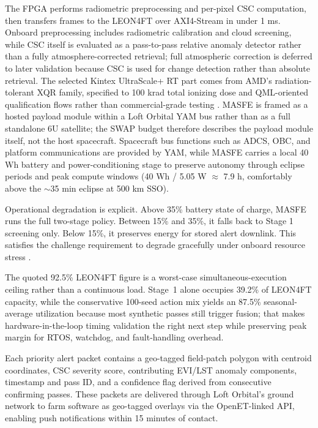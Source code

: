 \documentclass[11pt,letterpaper]{article}
\begin{document}
The FPGA performs radiometric preprocessing and per-pixel CSC computation, then transfers frames to the LEON4FT over AXI4-Stream in under 1 ms. Onboard preprocessing includes radiometric calibration and cloud screening, while CSC itself is evaluated as a pass-to-pass relative anomaly detector rather than a fully atmosphere-corrected retrieval; full atmospheric correction is deferred to later validation because CSC is used for change detection rather than absolute retrieval. The selected Kintex UltraScale+ RT part comes from AMD's radiation-tolerant XQR family, specified to 100 krad total ionizing dose and QML-oriented qualification flows rather than commercial-grade testing \cite{amd-xqr}. MASFE is framed as a hosted payload module within a Loft Orbital YAM bus rather than as a full standalone 6U satellite; the SWAP budget therefore describes the payload module itself, not the host spacecraft. Spacecraft bus functions such as ADCS, OBC, and platform communications are provided by YAM, while MASFE carries a local 40 Wh battery and power-conditioning stage to preserve autonomy through eclipse periods and peak compute windows (40 Wh / 5.05 W $\approx$ 7.9 h, comfortably above the $\sim$35 min eclipse at 500 km SSO).

Operational degradation is explicit. Above 35\% battery state of charge, MASFE runs the full two-stage policy. Between 15\% and 35\%, it falls back to Stage 1 screening only. Below 15\%, it preserves energy for stored alert downlink. This satisfies the challenge requirement to degrade gracefully under onboard resource stress \cite{nasa-challenge-brief}.

The quoted 92.5\% LEON4FT figure is a worst-case simultaneous-execution ceiling rather than a continuous load. Stage~1 alone occupies 39.2\% of LEON4FT capacity, while the conservative 100-seed action mix yields an 87.5\% seasonal-average utilization because most synthetic passes still trigger fusion; that makes hardware-in-the-loop timing validation the right next step while preserving peak margin for RTOS, watchdog, and fault-handling overhead.

Each priority alert packet contains a geo-tagged field-patch polygon with centroid coordinates, CSC severity score, contributing EVI/LST anomaly components, timestamp and pass ID, and a confidence flag derived from consecutive confirming passes. These packets are delivered through Loft Orbital's ground network to farm software as geo-tagged overlays via the OpenET-linked API, enabling push notifications within 15 minutes of contact.
\end{document}
